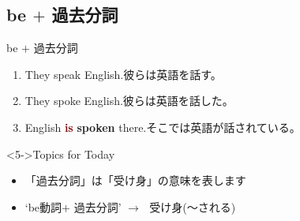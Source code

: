 \documentclass[aspectratio=169,xcolor={dvipsnames,table}]{beamer}
\newcommand{\myaudio}[1]{\href{#1}{\faVolumeUp}}
\begin{document}
\subsection{be $+$ 過去分詞}
\begin{frame}[plain]{be $+$ 過去分詞}
 \Large
\begin{enumerate}
 \item<1-> They speak English.\hfill{}{\small 彼らは英語を話す。}
 \item<2-> They spoke English.\hfill{\small 彼らは英語を話した。}
 \item<3-> English \textcolor{Maroon}{\bfseries is} \textcolor{NavyBlue}{\bfseries spoken} there.\hfill{\small そこでは英語が話されている。}
\end{enumerate}

\begin{center}
 
\end{center}

\vfill

\hfill\myaudio{./audio/051_passive_01.mp3}
\begin{exampleblock}<5->{Topics for Today}
\begin{itemize}[square]\small
 \item 「過去分詞」は「受け身」の意味を表します
 \item `be動詞$+$ 過去分詞' $\longrightarrow$\,\,\,\,受け身(〜される)
\end{itemize}
     \end{exampleblock}
\end{frame}
\end{document}
